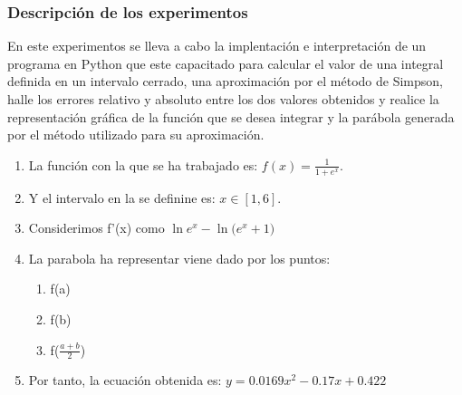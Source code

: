\documentclass{beamer}
\begin{document}
\begin{frame}
\frametitle{Descripción de los experimentos}
	En este experimentos se lleva a cabo la implentación e interpretación de un programa en Python que
 este capacitado para calcular el valor de una integral definida en un intervalo cerrado, una aproximación por 
 el método de Simpson, halle los errores relativo y absoluto entre los dos valores obtenidos y realice la representación
gráfica de la función que se desea integrar y la parábola generada por el método utilizado
para su aproximación.
 	
 \begin{enumerate}
    \item La función con la que se ha trabajado es: $f(x) = \frac{1}{1+e^{x}}$.
    \pause
    \item Y el intervalo en la se definine es: $x \in [1, 6]$.
    \pause
    \item Considerimos f'(x) como $\ln{e^{x}} - \ln({e^{x}+1)}$
    \pause
    \item La parabola ha representar viene dado por los puntos:
    \begin{enumerate}
      \item f(a)
      \pause
      \item f(b)
      \pause
      \item f($\frac{a+b}{2}$)
    \end{enumerate}
    \pause
    \item Por tanto, la ecuación obtenida es: $y = 0.0169x^2 - 0.17x + 0.422 $
      
 \end{enumerate}
\end{frame}
\end{document}

